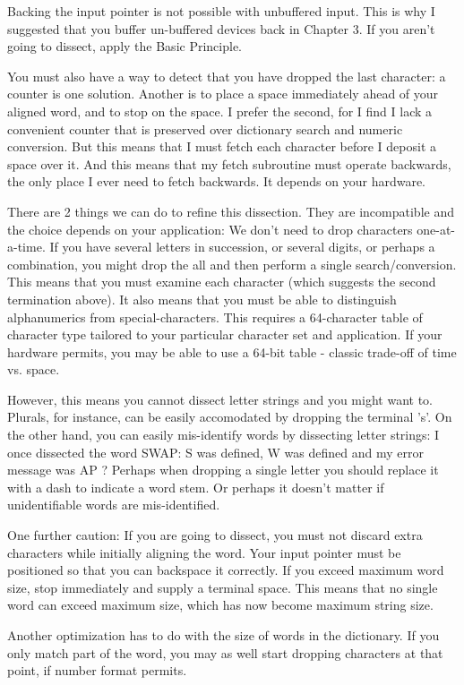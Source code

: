 \documentclass[b5paper, oneside]{book}
\begin{document}
Backing the input pointer is not possible with unbuffered input. This is why I suggested that you buffer un-buffered devices back in Chapter 3. If you aren't going to dissect, apply the Basic Principle.

You must also have a way to detect that you have dropped the last character: a counter is one solution. Another is to place a space immediately ahead of your aligned word, and to stop on the space. I prefer the second, for I find I lack a convenient counter that is preserved over dictionary search and numeric conversion. But this means that I must fetch each character before I deposit a space over it. And this means that my fetch subroutine must operate backwards, the only place I ever need to fetch backwards. It depends on your hardware.

There are 2 things we can do to refine this dissection. They are incompatible and the choice depends on your application: We don't need to drop characters one-at-a-time. If you have several letters in succession, or several digits, or perhaps a combination, you might drop the all and then perform a single search/conversion. This means that you must examine each character (which suggests the second termination above). It also means that you must be able to distinguish alphanumerics from special-characters. This requires a 64-character table of character type tailored to your particular character set and application. If your hardware permits, you may be able to use a 64-bit table - classic trade-off of time vs. space.

However, this means you cannot dissect letter strings and you might want to. Plurals, for instance, can be easily accomodated by dropping the terminal 's'. On the other hand, you can easily mis-identify words by dissecting letter strings: I once dissected the word SWAP: S was defined, W was defined and my error message was AP ? Perhaps when dropping a single letter you should replace it with a dash to indicate a word stem. Or perhaps it doesn't matter if unidentifiable words are mis-identified.

One further caution: If you are going to dissect, you must not discard extra characters while initially aligning the word. Your input pointer must be positioned so that you can backspace it correctly. If you exceed maximum word size, stop immediately and supply a terminal space. This means that no single word can exceed maximum size, which has now become maximum string size.

Another optimization has to do with the size of words in the dictionary. If you only match part of the word, you may as well start dropping characters at that point, if number format permits.
\end{document}
